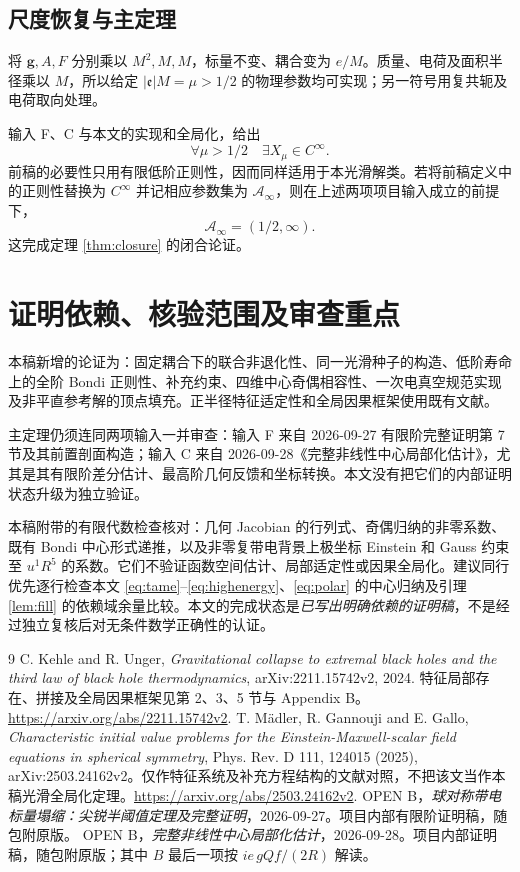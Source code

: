 \subsection{尺度恢复与主定理}
将 $\mathbf g,A,F$ 分别乘以 $M^2,M,M$，标量不变、耦合变为 $e/M$。质量、电荷及面积半径乘以 $M$，所以给定 $|\mathfrak e|M=\mu>1/2$ 的物理参数均可实现；另一符号用复共轭及电荷取向处理。

输入 F、C 与本文的实现和全局化，给出
\[
\forall\mu>1/2\quad\exists X_\mu\in C^\infty.
\]
前稿的必要性只用有限低阶正则性，因而同样适用于本光滑解类。若将前稿定义中的正则性替换为 $C^\infty$ 并记相应参数集为 $\mathscr A_\infty$，则在上述两项项目输入成立的前提下，
\[
\boxed{\mathscr A_\infty=(1/2,\infty).}
\]
这完成定理 \ref{thm:closure} 的闭合论证。

\section{证明依赖、核验范围及审查重点}

本稿新增的论证为：固定耦合下的联合非退化性、同一光滑种子的构造、低阶寿命上的全阶 Bondi 正则性、补充约束、四维中心奇偶相容性、一次电真空规范实现及非平直参考解的顶点填充。正半径特征适定性和全局因果框架使用既有文献。

主定理仍须连同两项输入一并审查：输入 F 来自 2026-09-27 有限阶完整证明第 7 节及其前置剖面构造；输入 C 来自 2026-09-28《完整非线性中心局部化估计》，尤其是其有限阶差分估计、最高阶几何反馈和坐标转换。本文没有把它们的内部证明状态升级为独立验证。

本稿附带的有限代数检查核对：几何 Jacobian 的行列式、奇偶归纳的非零系数、既有 Bondi 中心形式递推，以及非零复带电背景上极坐标 Einstein 和 Gauss 约束至 $u^1R^5$ 的系数。它们不验证函数空间估计、局部适定性或因果全局化。建议同行优先逐行检查本文 \eqref{eq:tame}--\eqref{eq:highenergy}、\eqref{eq:polar} 的中心归纳及引理 \ref{lem:fill} 的依赖域余量比较。本文的完成状态是\emph{已写出明确依赖的证明稿}，不是经过独立复核后对无条件数学正确性的认证。

\begin{thebibliography}{9}
 C. Kehle and R. Unger, \emph{Gravitational collapse to extremal black holes and the third law of black hole thermodynamics}, arXiv:2211.15742v2, 2024. 特征局部存在、拼接及全局因果框架见第 2、3、5 节与 Appendix B。\url{https://arxiv.org/abs/2211.15742v2}.
 T. M\"adler, R. Gannouji and E. Gallo, \emph{Characteristic initial value problems for the Einstein-Maxwell-scalar field equations in spherical symmetry}, Phys. Rev. D 111, 124015 (2025), arXiv:2503.24162v2。仅作特征系统及补充方程结构的文献对照，不把该文当作本稿光滑全局化定理。\url{https://arxiv.org/abs/2503.24162v2}.
 OPEN B，\emph{球对称带电标量塌缩：尖锐半阈值定理及完整证明}，2026-09-27。项目内部有限阶证明稿，随包附原版。
 OPEN B，\emph{完整非线性中心局部化估计}，2026-09-28。项目内部证明稿，随包附原版；其中 $B$ 最后一项按 $ie\,gQf/(2R)$ 解读。
\end{thebibliography}
